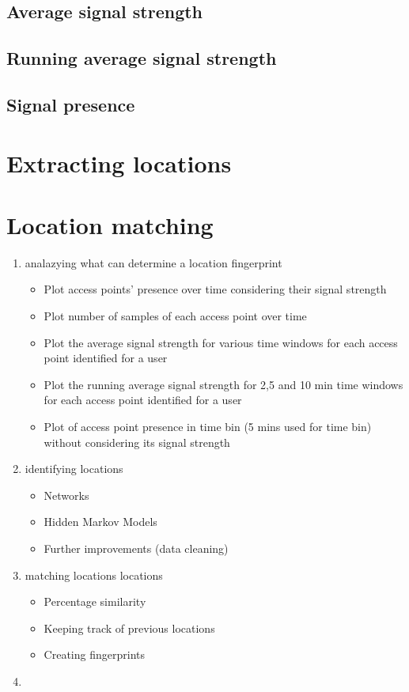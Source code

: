 \subsection{Average signal strength}
\subsection{Running average signal strength}
\subsection{Signal presence}

\section{Extracting locations}
\section{Location matching}

\begin{enumerate}
  \item analazying what can determine a location fingerprint
	\begin{itemize}
		\item Plot access points’ presence over time considering their signal strength
		\item Plot number of samples of each access point over time
		\item Plot the average signal strength for various time windows for each
		access point identified for a user
		\item Plot the running average signal strength for 2,5 and 10 min time windows
		for each access point identified for a user
		\item Plot of access point presence in time bin (5 mins used for time bin)
		without considering its signal strength
	\end{itemize}
  \item identifying locations
	\begin{itemize}
		\item Networks 
		\item Hidden Markov Models 
		\item Further improvements (data cleaning)
	\end{itemize}
  \item matching locations locations
	\begin{itemize}
		\item Percentage similarity 
		\item Keeping track of previous locations 
		\item Creating fingerprints
	\end{itemize}
  \item  
\end{enumerate}